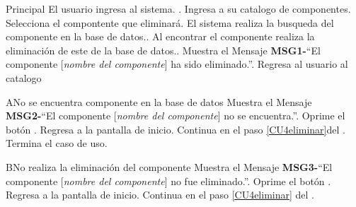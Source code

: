 	\begin{UCtrayectoria}{Principal}
		\UCpaso[\UCactor] El usuario ingresa al sistema.  \label{CU17Login}.
		\UCpaso[\UCactor] Ingresa a su catalogo de componentes.
		\UCpaso[\UCactor] Selecciona el compontente que eliminará.
		\UCpaso El sistema realiza la busqueda del componente en la base de datos..
		\UCpaso Al encontrar el componente realiza la eliminación de este de la base de datos..
		\UCpaso Muestra el Mensaje {\bf MSG1-}``El componente [{\em nombre del componente}] ha sido eliminado.''.
		\UCpaso Regresa al usuario al catalogo \label{CU4eliminar}
		
	\end{UCtrayectoria}
		
		\begin{UCtrayectoriaA}{A}{No se encuentra componente en la base de datos}
			\UCpaso Muestra el Mensaje {\bf MSG2-}``El componente [{\em nombre del componente}] no se encuentra.''.
			\UCpaso[\UCactor] Oprime el botón .
			\UCpaso Regresa a la pantalla de inicio. 
			\UCpaso Continua en el paso \ref{CU4eliminar}del .
			\UCpaso[] Termina el caso de uso.
		\end{UCtrayectoriaA}
		
		\begin{UCtrayectoriaA}{B}{No realiza la eliminación del componente}
			\UCpaso  Muestra el Mensaje {\bf MSG3-}``El componente [{\em nombre del componente}] no fue eliminado.''.
			\UCpaso[\UCactor] Oprime el botón .
			\UCpaso Regresa a la pantalla de inicio. 
			\UCpaso Continua en el paso \ref{CU4eliminar} del .
		\end{UCtrayectoriaA}

